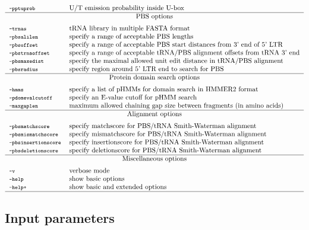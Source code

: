 \documentclass[12pt,titlepage]{article}
\begin{document}
\begin{table}[htbp]
\begin{footnotesize}
\[\begin{tabular}{ll}
\\
\Showoption{pptuprob}& U/T emission probability inside U-box
\\
\Showoptiongroup{PBS options}
\Showoption{trnas}& tRNA library in multiple FASTA format
\\
\Showoption{pbsalilen}& specify a range of acceptable PBS lengths
\\
\Showoption{pbsoffset}& specify a range of acceptable PBS start distances from 3' end of 5' LTR
\\
\Showoption{pbstrnaoffset}& specify a range of acceptable tRNA/PBS alignment offsets from tRNA 3' end
\\
\Showoption{pbsmaxedist}& specify the maximal allowed unit edit distance in tRNA/PBS alignment
\\
\Showoption{pbsradius}& specify region around 5' LTR end to search for PBS
\\
\Showoptiongroup{Protein domain search options}
\Showoption{hmms}& specify a list of pHMMs for domain search in HMMER2 format
\\
\Showoption{pdomevalcutoff}& specify an E-value cutoff for pHMM search
\\
\Showoption{maxgaplen}& maximum allowed chaining gap size between fragments (in amino acids)

\\
\Showoptiongroup{Alignment options}
\Showoption{pbsmatchscore}& specify matchscore for PBS/tRNA Smith-Waterman alignment
\\
\Showoption{pbsmismatchscore}& specify mismatchscore for PBS/tRNA Smith-Waterman alignment
\\
\Showoption{pbsinsertionscore}& specify insertionscore for PBS/tRNA Smith-Waterman alignment
\\
\Showoption{pbsdeletionscore}& specify deletionscore for PBS/tRNA Smith-Waterman alignment
\\
\Showoptiongroup{Miscellaneous options}
\Showoption{v}& verbose mode
\\
\Showoption{help}& show basic options
\\
\Showoption{help+}& show basic and extended options
\\
\hline
\end{tabular}
\]
\end{footnotesize}
\label{overviewOpt}
\end{table}

\newpage
\subsection{Input parameters}
\end{document}

